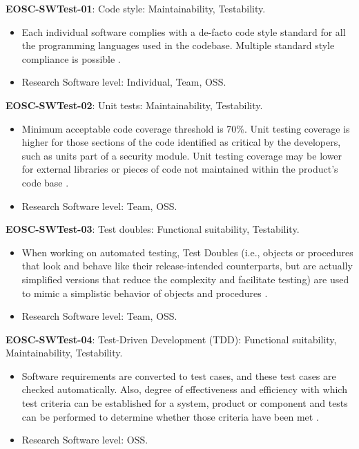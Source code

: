 \textbf{EOSC-SWTest-01}: Code style: Maintainability, Testability.

\begin{itemize}
    \item Each individual software complies with a de-facto code style standard for all the programming languages used in the codebase. Multiple standard style compliance is possible \cite{orviz_set_2017,raymond_software_2013}.
    \item Research Software level: Individual, Team, OSS.
\end{itemize}

\textbf{EOSC-SWTest-02}: Unit tests: Maintainability, Testability.

\begin{itemize}
    \item Minimum acceptable code coverage threshold is 70\%. Unit testing coverage is higher for those sections of the code identified as critical by the developers, such as units part of a security module. Unit testing coverage may be lower for external libraries or pieces of code not maintained within the product's code base \cite{aberdour_achieving_2007,nagappan_early_2005,boehm_quantitative_1976,shepherdson_cessda_2019,orviz_set_2017,raymond_software_2013}.
    \item Research Software level: Team, OSS.
\end{itemize}

\textbf{EOSC-SWTest-03}: Test doubles: Functional suitability, Testability.

\begin{itemize}
    \item When working on automated testing,  Test Doubles (i.e., objects or procedures that look and behave like their release-intended counterparts, but are actually simplified versions that reduce the complexity and facilitate testing) are used to mimic a simplistic behavior of objects and procedures \cite{orviz_set_2017,orviz_fernandez_eosc-synergy_2020}.
    \item Research Software level: Team, OSS.
\end{itemize}

\textbf{EOSC-SWTest-04}: Test-Driven Development (TDD): Functional suitability, Maintainability, Testability.

\begin{itemize}
    \item Software requirements are converted to test cases, and these test cases are checked automatically. Also, degree of effectiveness and efficiency with which test criteria can be established for a system, product or component and tests can be performed to determine whether those criteria have been met \cite{iso_25010_2011_2017,crispin_driving_2006,zuser_software_2005,orviz_set_2017}.
    \item Research Software level: OSS.
\end{itemize}


